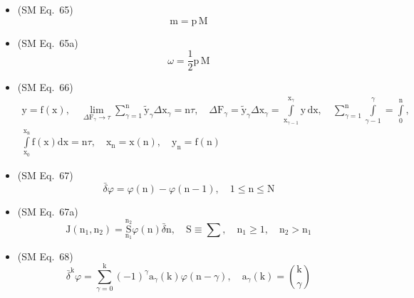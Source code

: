 \documentclass[
    12pt,              %
    a4paper,           %
    headings=normal,   %
    twoside=true,      %
    BCOR=8mm,          %
]{scrbook}
\begin{document}
\begin{itemize}[label={},leftmargin=0pt]
    \item (SM Eq.\ 65) 
    \[
    \mathrm{m} = \mathrm{p}\,\mathrm{M}
    \]

    \item (SM Eq.\ 65a) 
    \[
    \omega = \frac{1}{2}\mathrm{p}\,\mathrm{M}
    \]

    \item (SM Eq.\ 66) 
    \[
    \begin{gathered}
    \mathrm{y} = \mathrm{f}(\mathrm{x}), \quad \lim_{\Delta \mathrm{F}_\gamma \to \tau} \sum_{\gamma=1}^{\mathrm{n}} \tilde{\mathrm{y}}_\gamma \Delta \mathrm{x}_\gamma = \mathrm{n}\tau, \quad \Delta \mathrm{F}_\gamma = \tilde{\mathrm{y}}_\gamma \Delta \mathrm{x}_\gamma = \int\limits_{\mathrm{x}_{\gamma-1}}^{\mathrm{x}_\gamma} \mathrm{y}\,\mathrm{dx}, \quad \sum_{\gamma=1}^{\mathrm{n}} \int\limits_{\gamma-1}^{\gamma} = \int\limits_0^{\mathrm{n}}, \\
    \int\limits_{\mathrm{x}_0}^{\mathrm{x}_{\mathrm{n}}} \mathrm{f}(\mathrm{x})\mathrm{dx} = \mathrm{n}\tau, \quad \mathrm{x}_{\mathrm{n}} = \mathrm{x}(\mathrm{n}), \quad \mathrm{y}_{\mathrm{n}} = \mathrm{f}(\mathrm{n})
    \end{gathered}
    \]

    \item (SM Eq.\ 67) 
    \[
    \bar{\delta}\varphi = \varphi(\mathrm{n}) - \varphi(\mathrm{n}-1), \quad 1 \le \mathrm{n} \le \mathrm{N}
    \]

    \item (SM Eq.\ 67a) 
    \[
    \mathrm{J}(\mathrm{n}_1, \mathrm{n}_2) = \underset{\mathrm{n}_1}{\overset{\mathrm{n}_2}{\mathrm{S}}} \varphi(\mathrm{n})\bar{\delta}\mathrm{n}, \quad \mathrm{S} \equiv \sum, \quad \mathrm{n}_1 \ge 1, \quad \mathrm{n}_2 > \mathrm{n}_1
    \]

    \item (SM Eq.\ 68) 
    \[
    \bar{\delta}^\mathrm{k} \varphi = \sum_{\gamma=0}^\mathrm{k} (-1)^\gamma \mathrm{a}_\gamma(\mathrm{k}) \varphi(\mathrm{n}-\gamma), \quad \mathrm{a}_\gamma(\mathrm{k}) = \binom{\mathrm{k}}{\gamma}
    \]


\end{itemize}
\end{document}
